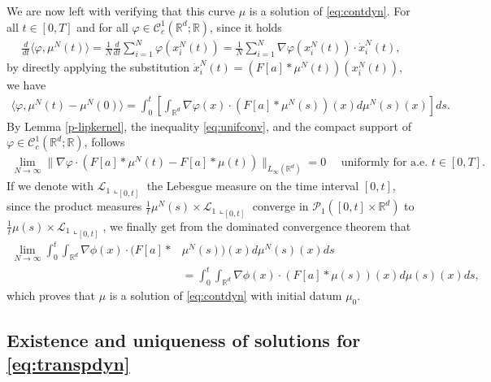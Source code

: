 \documentclass[A4paper,11pt]{article}
\theoremstyle{definition}
\newcommand{\R}{\mathbb{R}}
\begin{document}
We are now left with verifying that this curve $\mu$ is a solution of \eqref{eq:contdyn}. For all $t \in [0,T]$ and for all $\varphi \in \mathcal{C}^1_c(\R^d;\R)$, since it holds
\begin{align*}
\frac{d}{dt}\langle \varphi, \mu^N(t) \rangle = \frac{1}{N}\frac{d}{dt} \sum^N_{i = 1} \varphi(x^N_i(t)) = \frac{1}{N} \sum^N_{i = 1} \nabla\varphi(x^N_i(t)) \cdot \dot{x}_i^N(t),
\end{align*}
by directly applying the substitution $\dot{x}_i^N(t) = (F[a]*\mu^N(t))(x^N_i(t))$, we have
\begin{align*}
\langle \varphi, \mu^N(t) - \mu^N(0) \rangle = \int^t_0 \left[ \int_{\R^d}\nabla \varphi(x) \cdot (F[a]*\mu^N(s))(x) d\mu^N(s)(x) \right] ds.
\end{align*}
By Lemma \ref{p-lipkernel}, the inequality \eqref{eq:unifconv}, and the compact support of $\varphi \in \mathcal{C}^1_c(\R^d;\R)$, follows
\begin{align*}
\lim_{N \rightarrow \infty} \|\nabla\varphi \cdot (F[a]*\mu^N(t) - F[a]*\mu(t))\|_{L_{\infty}(\R^d)} = 0 \quad \text{ uniformly for a.e. } t \in [0,T].
\end{align*}
If we denote with $\mathcal L_1\llcorner_{[0,t]}$ the Lebesgue measure on the time interval $[0,t]$, since the product measures $\frac{1}{t} \mu^{N}(s) \times \mathcal L_1\llcorner_{[0,t]}$ converge in $\mathcal P_1([0,t] \times \mathbb R^{d})$ to $\frac{1}{t} \mu(s) \times \mathcal L_1\llcorner_{[0,t]}$, we finally get from the dominated convergence theorem that
\begin{align*}
\lim_{N \to \infty} \int_0^{t} \int_{\mathbb R^{d}} \nabla \phi(x) \cdot (F[a]*&\mu^N(s))(x) d\mu^N(s)(x) ds \\
&=  \int_0^{t} \int_{\mathbb R^{d}} \nabla \phi(x) \cdot (F[a]*\mu(s))(x) d \mu(s)(x) ds,
\end{align*}
which proves that $\mu$ is a solution of \eqref{eq:contdyn} with initial datum $\mu_0$.


\subsection{Existence and uniqueness of solutions for  \eqref{eq:transpdyn}}\label{ap3}
\end{document}

